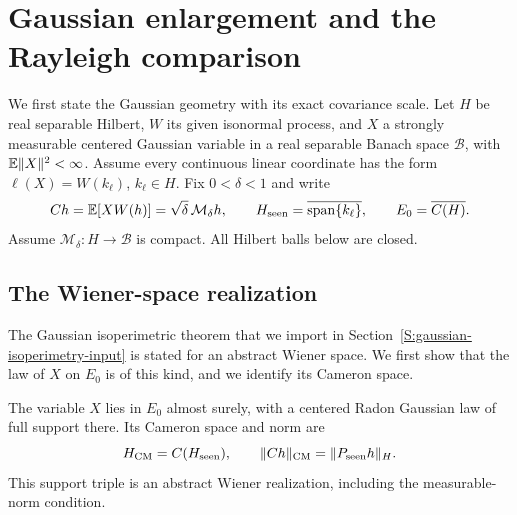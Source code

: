 \section{Gaussian enlargement and the Rayleigh comparison}
\label{S:actual-gaussian-tubes}

We first state the Gaussian geometry with its exact covariance scale. Let $H$ be
real separable Hilbert, $W$ its given isonormal process, and $X$ a strongly
measurable centered Gaussian variable in a real separable Banach space
$\mathscr{B}$, with $\mathbb{E}\|X\|^2 < \infty$. Assume every continuous linear
coordinate has the form $\ell(X) = W(k_\ell)$, $k_\ell \in H$. Fix $0 < \delta <
1$ and write
\begin{equation}\label{E:tube-covariance-scale}
  Ch=\mathbb{E}[XW(h)]=\sqrt\delta\,\mathcal{M}_\delta h,\qquad
  H_{\rm seen}=\overline{\operatorname{span}\{k_\ell\}},\qquad
  E_0=\overline{C(H)} .
\end{equation}
Assume $\mathcal{M}_\delta:H \to \mathscr{B}$ is compact. All Hilbert balls
below are closed.

\subsection{The Wiener-space realization}

The Gaussian isoperimetric theorem that we import in
Section~\ref{S:gaussian-isoperimetry-input} is stated for an abstract Wiener
space. We first show that the law of $X$ on $E_0$ is of this kind, and we
identify its Cameron space.

\begin{proposition}
  \label{P:tube-wiener-realization}
  The variable $X$ lies in $E_0$ almost surely, with a centered Radon Gaussian
  law of full support there. Its Cameron space and norm are
  \begin{equation}\label{E:tube-cameron-space}
    H_{\rm CM}=C(H_{\rm seen}),\qquad
    \|Ch\|_{\rm CM}=\|P_{\rm seen}h\|_H .
  \end{equation}
  This support triple is an abstract Wiener realization, including the
  measurable-norm condition.
\end{proposition}

